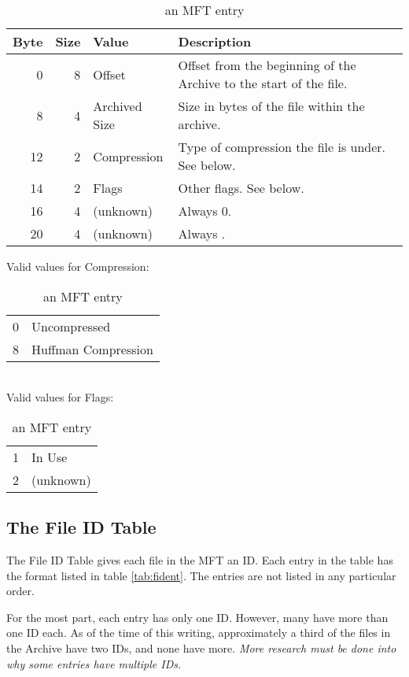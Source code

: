 \begin{table}[htbp]\begin{center}
	\caption{an MFT entry}
	\label{tab:mftent}
	
	\begin{tabular}{|r|r|l|p{2.5in}|}
		\hline
		\textbf{Byte} & \textbf{Size} & \textbf{Value} & \textbf{Description} \\
		\hline
		 0 & 8 & Offset        & Offset from the beginning of the Archive to the
		                         start of the file.  \\
		\hline
		 8 & 4 & Archived Size & Size in bytes of the file within the archive.  \\
		\hline
		12 & 2 & Compression   & Type of compression the file is under.  See below.  \\
		\hline
		14 & 2 & Flags         & Other flags.  See below.  \\
		\hline
		16 & 4 & (unknown)     & Always 0.  \\
		\hline
		20 & 4 & (unknown)     & Always \hex{4867~4BC7}.  \\
		\hline
	\end{tabular}
	
	Valid values for Compression:
	\begin{tabular}{rl}
		\hline
		0 & Uncompressed \\
		8 & Huffman Compression \\
		\hline
	\end{tabular}
	\\
	
	Valid values for Flags:
	\begin{tabular}{rl}
		\hline
		1 & In Use \\
		2 & (unknown) \\
		\hline
	\end{tabular}
\end{center}\end{table}


\subsection{The File ID Table}
\label{subsec:fidtab}

The File ID Table gives each file in the MFT an ID.  Each entry in the table
has the format listed in table \ref{tab:fident}.  The entries are not listed in
any particular order.

For the most part, each entry has only one ID.  However, many have more than one
ID each.  As of the time of this writing, approximately a third of the files in
the Archive have two IDs, and none have more.  \emph{More research must be done
into why some entries have multiple IDs.}

